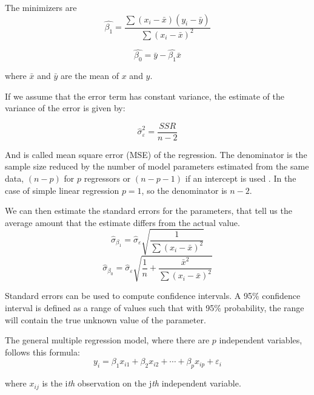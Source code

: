 The minimizers are
\begin{equation}
	\widehat{\beta_{1}} = \frac{\sum(x_i - \bar{x})(y_i - \bar{y})}{\sum(x_i - \bar{x})^2}
\end{equation}

\begin{equation}
	\widehat{\beta_{0}} = \bar{y} - \widehat{\beta_{1}} \bar {x}
\end{equation}

where $\bar{x}$ and $\bar{y}$ are the mean of $x$ and $y$.

If we assume that the error term has constant variance, the estimate of the variance of the error is given by:

\begin{equation}
	\widehat{\sigma}_{\varepsilon }^{2} = \frac{SSR}{n-2}
\end{equation}

And is called mean square error (MSE) of the regression. The denominator is the sample size reduced by the number of model parameters estimated from the same data, $(n-p)$ for $p$ regressors or  $(n-p-1)$ if an intercept is used \cite{MSE}. In the case of simple linear regression $p=1$, so the denominator is $n-2$.

We can then estimate the standard errors for the parameters, that tell us the average amount that the estimate differs from the actual value.
\begin{equation}
	{\widehat{\sigma}_{\beta _{1}} = {\widehat{\sigma}_{\varepsilon}{\sqrt{\frac{1}{\sum(x_{i} - {\bar {x}})^{2}}}}}}
\end{equation}
\begin{equation}
	{\widehat{\sigma}_{\beta _{0}} = {\widehat{\sigma}_{\varepsilon}{\sqrt{\frac{1}{n} + \frac{\bar{x}^2}{\sum(x_{i} - {\bar {x}})^{2}}}}}}
\end{equation}

Standard errors can be used to compute confidence intervals. A 95\% confidence interval is defined as a range of values such that with 95\% probability, the range will contain the true unknown value of the parameter.

The general multiple regression model, where there are $p$ independent variables, follows this formula:
\begin{equation}
	y_{i}=\beta_{1}x_{i1} + \beta_{2}x_{i2} + \cdots + \beta_{p}x_{ip} + \varepsilon_{i}
\end{equation}

where $x_{ij}$ is the i\textit{th} observation on the j\textit{th} independent variable.

